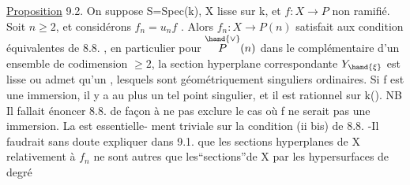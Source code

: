 \uline{Proposition} 9.2. On suppose S=Spec(k), X lisse sur k, et $f\colon X\to P$ non
ramifié. Soit $n \geq 2$, et considérons $f_n = u_n f$ . Alors $f_n : X \to P(n)$
satisfait aux condition équivalentes de 8.8. , en particulier
pour \hand{$\xi \in$} $\overset{\hand{\vee}}{P}(n)$ dans le complémentaire d'un ensemble de codimension $\geq 2$,
la section hyperplane correspondante $Y_{\hand{\xi}}$ est lisse  ou admet qu'un
, lesquels sont géométriquement singuliers
ordinaires. Si f est une immersion, il y a au
plus un tel point singulier, et il est rationnel sur k(\hand{$\xi$}).
 NB Il fallait énoncer 8.8. de façon à  ne pas exclure le
cas où f ne serait pas une immersion. La  est essentielle-%
ment triviale sur la condition (ii bis) de 8.8. -Il faudrait sans doute
expliquer dans 9.1. que les sections hyperplanes de X relativement à
 $f_n$ ne sont autres que les``sections''de X par les hypersurfaces de degré
